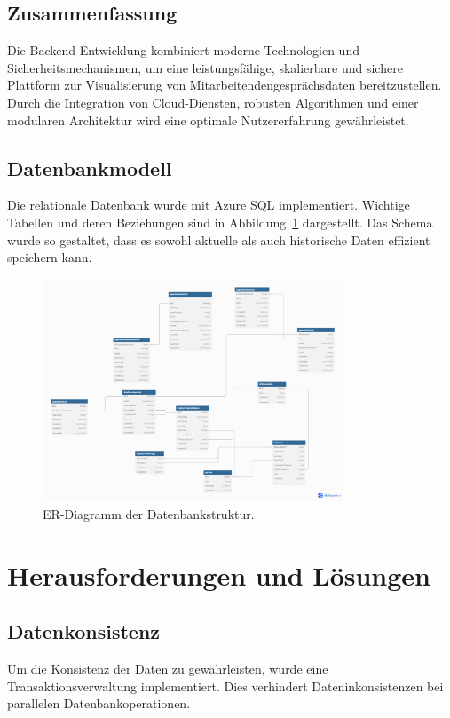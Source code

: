\subsection{Zusammenfassung}
Die Backend-Entwicklung kombiniert moderne Technologien und Sicherheitsmechanismen, um eine leistungsfähige, skalierbare und sichere Plattform zur Visualisierung von Mitarbeitendengesprächsdaten bereitzustellen. Durch die Integration von Cloud-Diensten, robusten Algorithmen und einer modularen Architektur wird eine optimale Nutzererfahrung gewährleistet.


\subsection{Datenbankmodell}
Die relationale Datenbank wurde mit Azure SQL implementiert. Wichtige Tabellen und deren Beziehungen sind in Abbildung~\ref{fig:db_er_model} dargestellt. Das Schema wurde so gestaltet, dass es sowohl aktuelle als auch historische Daten effizient speichern kann.

\begin{figure}[h!]
    \centering
    \includegraphics[width=0.8\textwidth]{images/er_modell_design.png}
    \caption{ER-Diagramm der Datenbankstruktur.}
    \label{fig:db_er_model}
\end{figure}

\section{Herausforderungen und Lösungen}
\subsection{Datenkonsistenz}
Um die Konsistenz der Daten zu gewährleisten, wurde eine Transaktionsverwaltung implementiert. Dies verhindert Dateninkonsistenzen bei parallelen Datenbankoperationen.

